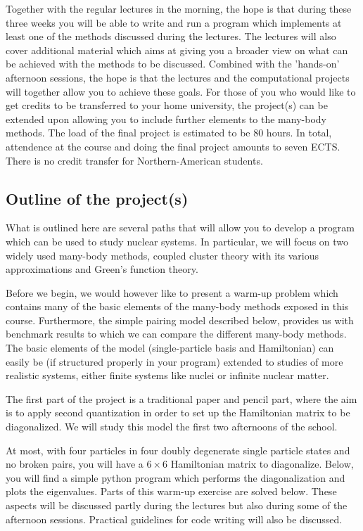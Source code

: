 \documentclass[%
twoside,                 %
final,                   %
10pt]{article}
\begin{document}
Together with the regular lectures in the morning, the hope is that
during these three weeks you will be able to write and run a program
which implements at least one of the methods discussed during the
lectures.  The lectures will also cover additional material which aims
at giving you a broader view on what can be achieved with the methods
to be discussed. Combined with the 'hands-on' afternoon sessions, the
hope is that the lectures and the computational projects will together
allow you to achieve these goals. For those of you who would like to
get credits to be transferred to your home university, the project(s)
can be extended upon allowing you to include further elements to the
many-body methods. The load of the final project is estimated to be 
80 hours. In total, attendence at the course and doing
the final project amounts to seven ECTS. There is no credit transfer
for Northern-American students.

\subsection{Outline of the project(s)}

What is outlined here are several paths that will allow you to develop
a program which can be used to study nuclear systems. In particular,
we will focus on two widely used many-body methods, coupled cluster
theory with its various approximations and Green's function theory.

Before we begin, we would however like to present a warm-up problem which 
contains
many of the basic elements of the many-body methods exposed in this course. Furthermore, the simple pairing 
model described below, provides us with  benchmark results to which we can compare 
the different many-body methods. The basic elements of the model (single-particle basis and Hamiltonian)
can easily be (if structured properly in your program) extended to studies of more realistic systems, either 
finite systems like nuclei or infinite nuclear matter. 

The first part of the project is a traditional paper and pencil part, where the aim is to 
apply second quantization in order to set up the Hamiltonian matrix to be diagonalized.
We will study this model the first two afternoons of the school. 

At most, with four particles in four doubly degenerate single particle states and no broken pairs,
you will have a $6 \times 6$ Hamiltonian matrix to diagonalize. Below, you will find a simple python program
which performs the diagonalization and plots the eigenvalues. Parts of this warm-up exercise are solved below. 
These aspects will be discussed partly during the lectures but also during some of the afternoon sessions.
Practical guidelines for code writing will also be discussed.
\end{document}
